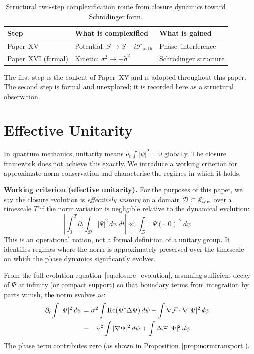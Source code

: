 \documentclass[12pt]{article}
\newcommand{\Fcal}{\mathcal{F}}
\newcommand{\Sadm}{\mathcal{S}_{\mathrm{adm}}}
\begin{document}
\begin{table}[ht]
\centering
\caption{Structural two-step complexification route from closure dynamics toward Schr\"odinger form.}
\label{tab:twostep}
\begin{tabular}{@{}lll@{}}
\toprule
Step & What is complexified & What is gained \\
\midrule
Paper~XV & Potential: $S \to S - i\Fcal_{\mathrm{path}}$ & Phase, interference \\
Paper~XVI (formal) & Kinetic: $\sigma^2 \to -\tilde{\sigma}^2$ & Schr\"odinger structure \\
\bottomrule
\end{tabular}
\end{table}

The first step is the content of Paper~XV and is adopted throughout this paper. The second step is formal and unexplored; it is recorded here as a structural observation.

\section{Effective Unitarity}\label{sec:unitarity}

In quantum mechanics, unitarity means $\partial_t \int |\psi|^2 = 0$ globally. The closure framework does not achieve this exactly. We introduce a working criterion for approximate norm conservation and characterise the regimes in which it holds.

\textbf{Working criterion (effective unitarity).}\label{def:effunitary} For the purposes of this paper, we say the closure evolution is \textit{effectively unitary} on a domain $\mathcal{D} \subset \Sadm$ over a timescale $T$ if the norm variation is negligible relative to the dynamical evolution:
\begin{equation}
    \left|\int_0^T \partial_t \int_{\mathcal{D}} |\Psi|^2\, d\psi\, dt\right| \ll \int_{\mathcal{D}} |\Psi(\cdot, 0)|^2\, d\psi
\end{equation}
This is an operational notion, not a formal definition of a unitary group. It identifies regimes where the norm is approximately preserved over the timescale on which the phase dynamics significantly evolves.

From the full evolution equation~\eqref{eq:closure_evolution}, assuming sufficient decay of $\Psi$ at infinity (or compact support) so that boundary terms from integration by parts vanish, the norm evolves as:
\begin{align}\label{eq:normevolution}
    \partial_t \int |\Psi|^2\, d\psi &= \sigma^2 \int \mathrm{Re}(\Psi^*\Delta\Psi)\, d\psi - \int \nabla\Fcal \cdot \nabla|\Psi|^2\, d\psi \notag \\
    &= -\sigma^2 \int |\nabla\Psi|^2\, d\psi + \int \Delta\Fcal\, |\Psi|^2\, d\psi
\end{align} The phase term contributes zero (as shown in Proposition~\ref{prop:normtransport}).
\end{document}
